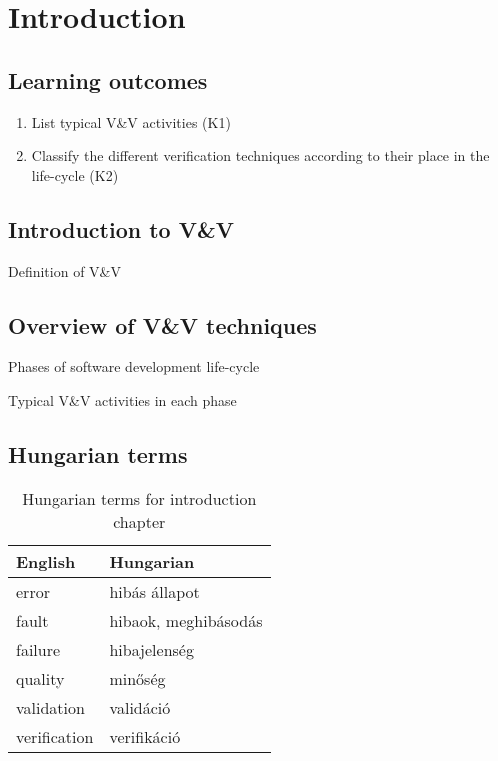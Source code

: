 \chapter{Introduction}
\label{cha:introduction}


\section*{Learning outcomes}

\begin{enumerate}
    \item List typical V\&V activities (K1)
    \item Classify the different verification techniques according to their place in the life-cycle (K2)
\end{enumerate}


\section{Introduction to V\&V}

Definition of V\&V


\section{Overview of V\&V techniques}

Phases of software development life-cycle

Typical V\&V activities in each phase


\section{Hungarian terms}

\begin{table}[ht]
    \centering
    \small
    \caption{Hungarian terms for introduction chapter}
    \begin{tabular}{ll}
        \toprule
        \textbf{English} & \textbf{Hungarian} \\
        \midrule
        error & hibás állapot \\
        fault & hibaok, meghibásodás \\
        failure & hibajelenség \\
        quality & minőség \\
        validation & validáció \\
        verification & verifikáció \\
        \bottomrule
    \end{tabular}
    \label{tab:overview:hungarian-terms-overview}
\end{table} 